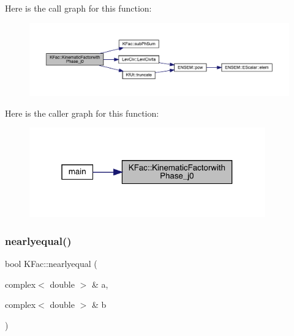 Here is the call graph for this function\+:
\nopagebreak
\begin{figure}[H]
\begin{center}
\leavevmode
\includegraphics[width=350pt]{d2/d89/namespaceKFac_a87a5304db9d4c659637da23e363cf4a4_cgraph}
\end{center}
\end{figure}
Here is the caller graph for this function\+:
\nopagebreak
\begin{figure}[H]
\begin{center}
\leavevmode
\includegraphics[width=289pt]{d2/d89/namespaceKFac_a87a5304db9d4c659637da23e363cf4a4_icgraph}
\end{center}
\end{figure}
\mbox{\label{namespaceKFac_a07acf360038cc03b8c6bd73f6724a7f5}} 
\subsubsection{\texorpdfstring{nearlyequal()}{nearlyequal()}}
{\footnotesize\ttfamily bool K\+Fac\+::nearlyequal (\begin{DoxyParamCaption}\item[{complex$<$ double $>$ \&}]{a,  }\item[{complex$<$ double $>$ \&}]{b }\end{DoxyParamCaption})}

\mbox{\label{namespaceKFac_a87e82af0cfc26fdde23953fb315dc9d5}} 
